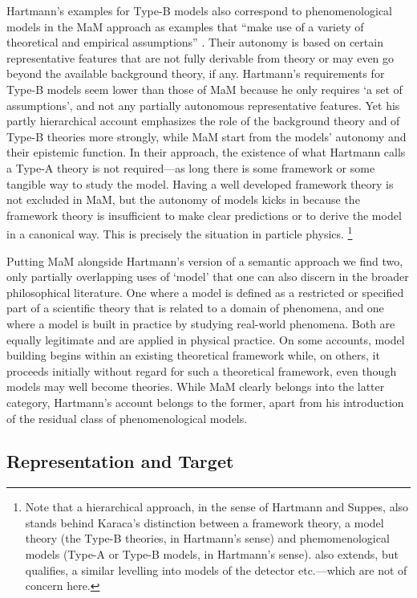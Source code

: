 Hartmann's examples for Type-B models also correspond to phenomenological models in the MaM approach as examples that ``make use of a variety of theoretical and empirical assumptions'' \citep[][p.~45]{morrison99}.
Their autonomy is based on certain representative features that are not fully derivable from theory or may even go beyond the available background theory, if any.  
Hartmann's requirements for Type-B models seem lower than those of MaM because he only requires `a set of assumptions', and not any partially autonomous representative features. 
Yet his partly hierarchical account emphasizes the role of the background theory and of Type-B theories more strongly, while MaM start from the models' autonomy and their epistemic function. 
In their approach, the existence of what Hartmann calls a Type-A theory is not required---as long there is some framework or some tangible way to study the model. 
Having a well developed framework theory is not excluded in MaM, but the autonomy of models kicks in because the framework theory is insufficient to make clear predictions or to derive the model in a canonical way. This is precisely the situation in particle physics.
\footnote{Note that a hierarchical approach, in the sense of Hartmann and Suppes, also stands behind Karaca's \citeyear{karaca2013} distinction between a framework theory, a model theory (the Type-B theories, in Hartmann's sense) and phemomenological models (Type-A or Type-B models, in Hartmann's sense). \citet{karaca2018} also extends, but qualifies, a similar levelling into models of the detector etc.---which are not of concern here.}

Putting MaM alongside Hartmann's version of a semantic approach we find two, only partially overlapping uses of `model' that one can also discern in the broader philosophical literature. 
One where a model is defined as a restricted or specified part of a scientific theory that is related to a domain of phenomena, and one where a model is built in practice by studying real-world phenomena.  
Both are equally legitimate and are applied in physical practice. 
On some accounts, model building begins within an existing theoretical framework while, on others, it proceeds initially without regard for such a theoretical framework, even though models may well become theories. While MaM clearly belongs into the latter category, Hartmann's account belongs to the former, apart from his introduction of the residual class of phenomenological models. 


\subsection{Representation and Target} \label{sub:reptarget}

